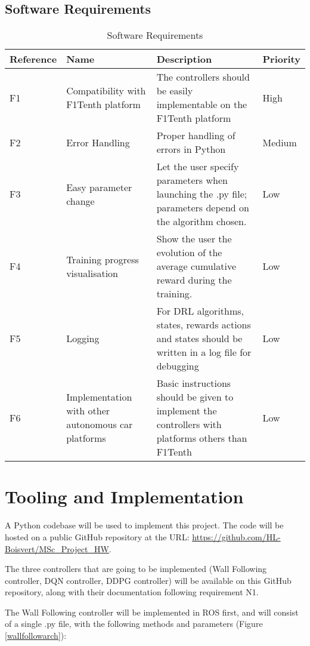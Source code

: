 \subsection{Software Requirements}
\label{softreq}

\begin{table}[H]
\centering
\begin{tabularx}{\textwidth}{||l|X|X|l||} 
 \hline
 Reference & Name & Description & Priority\\ [0.5ex] 
 \hline\hline
 F1 & Compatibility with F1Tenth platform & The controllers should be easily implementable on the F1Tenth platform & High\\
 \hline
 F2 & Error Handling & Proper handling of errors in Python & Medium\\
 \hline
 F3 & Easy parameter change & Let the user specify parameters when launching the .py file; parameters depend on the algorithm chosen. & Low\\
 \hline
 F4 & Training progress visualisation & Show the user the evolution of the average cumulative reward during the training. & Low\\
 \hline
 F5 &  Logging & For DRL algorithms, states, rewards actions and states should be written in a log file for debugging & Low \\
 \hline
 F6 &  Implementation with other autonomous car platforms & Basic instructions should be given to implement the controllers with platforms others than F1Tenth & Low \\ [1ex]
 \hline

\end{tabularx}
\caption{Software Requirements}
\label{sofreqtab}
\end{table}

\section{Tooling and Implementation}
\label{toolimp}

A Python codebase will be used to implement this project. The code will be hosted on a public GitHub repository at the URL: \url{https://github.com/HL-Boisvert/MSc_Project_HW}. \newline

The three controllers that are going to be implemented (Wall Following controller, DQN controller, DDPG controller) will be available on this GitHub repository, along with their documentation following requirement N1.

The Wall Following controller will be implemented in ROS first, and will consist of a single .py file, with the following methods and parameters (Figure \ref{wallfollowarch}):

